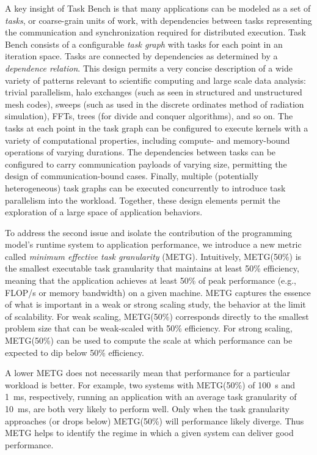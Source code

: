 A key insight of Task Bench is that many applications can be modeled
as a set of \emph{tasks}, or coarse-grain units of work, with
dependencies between tasks representing the communication and synchronization required for
distributed execution. Task Bench consists of a configurable \emph{task graph} with tasks for
each point in an iteration space. Tasks are connected by dependencies
as determined by a \emph{dependence relation}. This design permits a
very concise description of a wide variety of patterns relevant to
scientific computing and large scale data analysis: trivial parallelism, halo exchanges (such as
seen in structured and unstructured mesh codes), sweeps (such as used
in the discrete ordinates method of radiation simulation), FFTs, trees
(for divide and conquer algorithms), and so on. The tasks at each
point in the task graph can be configured to execute kernels with a
variety of computational properties, including compute- and
memory-bound operations of varying durations. The dependencies between
tasks can be configured to carry communication payloads of varying size, permitting
the design of communication-bound cases. Finally, multiple
(potentially heterogeneous) task graphs can be executed concurrently
to introduce task parallelism into the workload. Together, these
design elements permit the exploration of a large space of application
behaviors.

To address the second issue and isolate the contribution of the programming model's runtime system to application performance, we introduce a new metric called \emph{minimum effective task granularity} (METG). Intuitively, METG(50\%) is the smallest executable task granularity that maintains at least 50\% efficiency, meaning that the application achieves at least 50\% of peak
performance (e.g., FLOP/s or memory bandwidth) on a given machine. METG captures the essence of what is important in a weak
or strong scaling study, the behavior at the limit of scalability. For
weak scaling, METG(50\%) corresponds directly to the smallest problem size that can be weak-scaled with 50\% efficiency. For strong scaling, METG(50\%) can be used to compute the scale at which performance can be expected to dip below 50\% efficiency.

A lower METG does not necessarily mean that performance for a particular workload is
better. For example, two systems with METG(50\%) of 100~\textmu{}s and 1~ms,
respectively, running an application with an average task granularity
of 10~ms, are both very likely to perform well. Only when the task
granularity approaches (or drops below) METG(50\%) will performance
likely diverge. Thus METG helps to identify the regime in which a
given system can deliver good performance.


